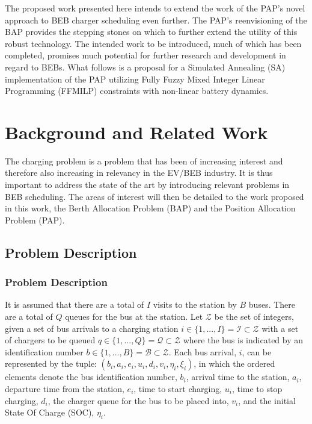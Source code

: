 \documentclass[ee,msthesis]{usuthesis}
\newcommand{\visit}{(b_i, a_i, e_i, u_i, d_i, v_i, \eta_i, \xi_i)}
\newcommand{\Iset}{\mathcal{I}}             %
\newcommand{\Bset}{\mathcal{B}}             %
\newcommand{\Qset}{\mathcal{Q}}             %
\begin{document}
The proposed work presented here intends to extend the work of the PAP's novel approach to BEB charger scheduling even
further. The PAP's reenvisioning of the BAP provides the stepping stones on which to further extend the utility of this
robust technology. The intended work to be introduced, much of which has been completed, promises much potential for
further research and development in regard to BEBs. What follows is a proposal for a Simulated Annealing (SA)
implementation of the PAP utilizing Fully Fuzzy Mixed Integer Linear Programming (FFMILP) constraints with non-linear
battery dynamics.

\section{Background and Related Work}
\label{sec:background-and-related-work}
The charging problem is a problem that has been of increasing interest and therefore also increasing in relevancy in the
EV/BEB industry. It is thus important to address the state of the art by introducing relevant problems in BEB
scheduling. The areas of interest will then be detailed to the work proposed in this work, the Berth Allocation Problem
(BAP) and the Position Allocation Problem (PAP).

\subsection{Problem Description}
\label{sec:problem-description}
\subsubsection{Problem Description}
\label{sec:problem-description}
It is assumed that there are a total of \(I\) visits to the station by \(B\) buses. There are a total of \(Q\) queues for the
bus at the station. Let \(\mathcal{Z}\) be the set of integers, given a set of bus arrivals to a charging station \(i \in \{1,..., I\}
= \Iset \subset \mathcal{Z}\) with a set of chargers to be queued \(q \in \{1,..., Q\} = \Qset \subset \mathcal{Z}\) where the bus is indicated by an
identification number \(b \in \{1,..., B\} = \Bset \subset \mathcal{Z}\). Each bus arrival, \(i\), can be represented by the tuple: \(\visit\),
in which the ordered elements denote the bus identification number, \(b_i\), arrival time to the station, \(a_i\), departure
time from the station, \(e_i\), time to start charging, \(u_i\), time to stop charging, \(d_i\), the charger queue for the bus
to be placed into, \(v_i\), and the initial State Of Charge (SOC), \(\eta_i\).
\end{document}
